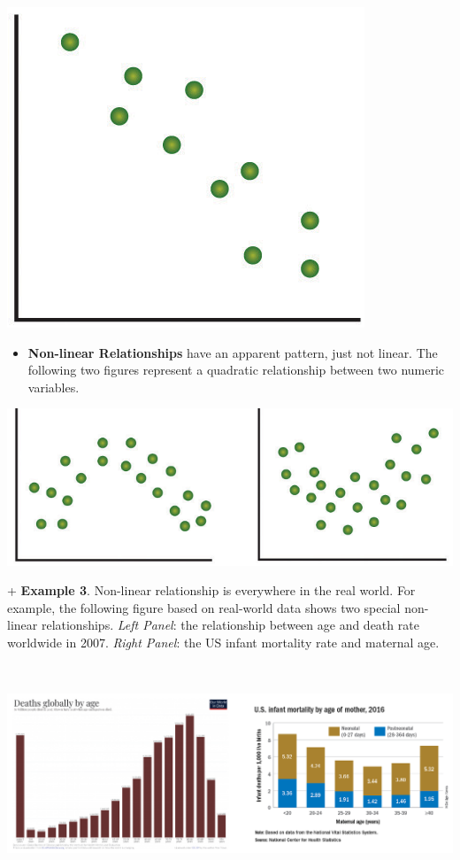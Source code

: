 \documentclass[
]{book}
\providecommand{\tightlist}{%
  \setlength{\itemsep}{0pt}\setlength{\parskip}{0pt}}
\begin{document}
\begin{center}\includegraphics[width=0.5\linewidth]{week12/linearNeg} \end{center}

\begin{itemize}
\tightlist
\item
  \textbf{Non-linear Relationships} have an apparent pattern, just not linear. The following two figures represent a quadratic relationship between two numeric variables.
\end{itemize}

\hfill\break

\begin{center}\includegraphics[width=0.6\linewidth]{week12/curveLinear} \end{center}

\hfill\break
+ \textbf{Example 3}. Non-linear relationship is everywhere in the real world. For example, the following figure based on real-world data shows two special non-linear relationships. \emph{Left Panel}: the relationship between age and death rate worldwide in 2007. \emph{Right Panel}: the US infant mortality rate and maternal age.

~

\begin{center}\includegraphics[width=0.8\linewidth]{week12/deathRates} \end{center}
\end{document}
